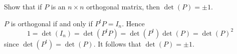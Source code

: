 \documentclass{ximera}
\author{Marty Golubitsky}
\begin{document}
\begin{exercise}\label{c7.4.3.B}

Show that if $P$ is an $n\times n$ orthogonal matrix, then $\det(P) = \pm 1$.
  
\begin{solution}


\soln $P$ is orthogonal if and only if $P^tP = I_n$. Hence
\[
1 = \det(I_n) = \det(P^tP) = \det(P^t)\det(P) = \det(P)^2
\]
since $\det(P^t) = \det(P)$.  It follows that $\det(P) = \pm1$. 

\end{solution}
\end{exercise}
\end{document}
